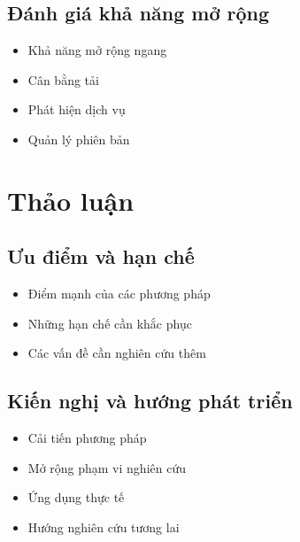 \subsection{Đánh giá khả năng mở rộng}
\begin{itemize}
    \item Khả năng mở rộng ngang
    \item Cân bằng tải
    \item Phát hiện dịch vụ
    \item Quản lý phiên bản
\end{itemize}

\section{Thảo luận}
\subsection{Ưu điểm và hạn chế}
\begin{itemize}
    \item Điểm mạnh của các phương pháp
    \item Những hạn chế cần khắc phục
    \item Các vấn đề cần nghiên cứu thêm
\end{itemize}

\subsection{Kiến nghị và hướng phát triển}
\begin{itemize}
    \item Cải tiến phương pháp
    \item Mở rộng phạm vi nghiên cứu
    \item Ứng dụng thực tế
    \item Hướng nghiên cứu tương lai
\end{itemize} 